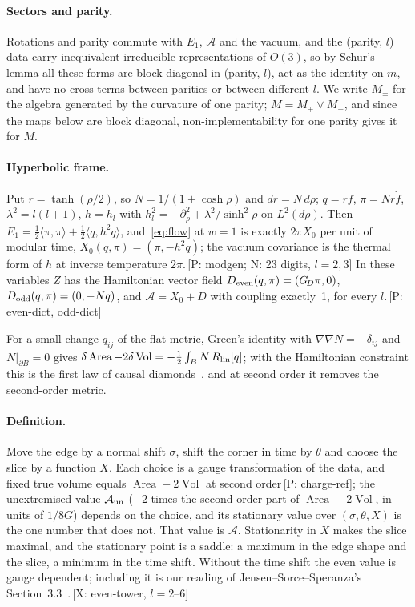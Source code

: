 \documentclass[11pt]{article}
\makeatletter
\newcommand{\cA}{\mathcal{A}}
\newcommand{\Area}{\operatorname{Area}}
\newcommand{\Vol}{\operatorname{Vol}}
\newcommand{\GD}{G_{\!D}}
\newcommand{\ip}[2]{\langle #1,#2\rangle}
\newcommand{\ev}[1]{\,{\textsf{\scriptsize[#1]}}}
\renewcommand\section{\@startsection{section}{1}{\z@}{-2.4ex \@plus -1ex \@minus -.2ex}{1.2ex \@plus .2ex}{\normalfont\Large\bfseries}}
\makeatother
\begin{document}
\paragraph{Sectors and parity.} Rotations and parity commute with $E_1$, $\cA$ and the vacuum, and the (parity, $l$) data carry inequivalent irreducible representations of $O(3)$, so by Schur's lemma all these forms are block diagonal in (parity, $l$), act as the identity on $m$, and have no cross terms between parities or between different $l$. We write $M_\pm$ for the algebra generated by the curvature of one parity; $M=M_+\vee M_-$, and since the maps below are block diagonal, non-implementability for one parity gives it for $M$.

\paragraph{Hyperbolic frame.} Put $r=\tanh(\rho/2)$, so $N=1/(1+\cosh\rho)$ and $dr=N\,d\rho$; $q=rf$, $\pi=Nr\dot f$, $\lambda^2=l(l+1)$, $h=h_l$ with $h_l^2=-\partial_\rho^2+\lambda^2/\sinh^2\!\rho$ on $L^2(d\rho)$. Then $E_1=\tfrac12\ip\pi\pi+\tfrac12\ip q{h^2q}$, and~\eqref{eq:flow} at $w=1$ is exactly $2\pi X_0$ per unit of modular time, $X_0(q,\pi)=(\pi,-h^2q)$; the vacuum covariance is the thermal form of $h$ at inverse temperature $2\pi$.\ev{P: modgen; N: 23 digits, $l=2,3$} In these variables $Z$ has the Hamiltonian vector field $D_{\rm even}(q,\pi)=(\GD\pi,0)$, $D_{\rm odd}(q,\pi)=(0,-Nq)$, and $\cA=X_0+D$ with coupling exactly~1, for every $l$.\ev{P: even-dict, odd-dict}

\section{The area-side charge}\label{sec:charge}

For a small change $q_{ij}$ of the flat metric, Green's identity with $\nabla\nabla N=-\delta_{ij}$ and $N|_{\partial B}=0$ gives $\delta\Area-2\delta\Vol=-\frac12\int_BN\,R_{\rm lin}[q]$; with the Hamiltonian constraint this is the first law of causal diamonds~\cite{JV}, and at second order it removes the second-order metric.

\paragraph{Definition.} Move the edge by a normal shift $\sigma$, shift the corner in time by $\theta$ and choose the slice by a function $X$. Each choice is a gauge transformation of the data, and fixed true volume equals $\Area-2\Vol$ at second order\ev{P: charge-ref}; the unextremised value $\cA_{\rm un}$ ($-2$ times the second-order part of $\Area-2\Vol$, in units of $1/8G$) depends on the choice, and its stationary value over $(\sigma,\theta,X)$ is the one number that does not. That value is $\cA$. Stationarity in $X$ makes the slice maximal, and the stationary point is a saddle: a maximum in the edge shape and the slice, a minimum in the time shift. Without the time shift the even value is gauge dependent; including it is our reading of Jensen--Sorce--Speranza's Section~3.3~\cite{JSS23}.\ev{X: even-tower, $l=2$--$6$}
\end{document}
